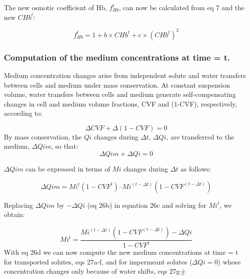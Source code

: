 \documentclass[a4paper]{article}
\newcommand{\cell}[1]{C#1}
\newcommand{\CHb}{\cell{Hb}}
\begin{document}
The new osmotic coefficient of Hb, $f_{Hb}^t$, can now be calculated from eq 7 and the new $\CHb^t$:

\setcounter{equation}{24}
\renewcommand{\theequation}{\arabic{equation}}

\begin{equation}
f_{Hb}^t = 1 + b\times\CHb^t + c\times (CHb^t)^2
\end{equation}

\subsubsection{Computation of the medium concentrations at time = t.}
Medium concentration changes arise from independent solute and water transfers between cells and medium under mass conservation.  At constant suspension volume, water transfers between cells and medium generate self-compensating changes in cell and medium volume fractions, CVF and (1-CVF), respectively, according to:

\setcounter{equation}{0}
\renewcommand{\theequation}{26\alph{equation}}

\begin{equation}
\Delta CVF + \Delta (1-CVF) = 0
\end{equation}
By mass conservation, the $Qi$ changes during $\Delta t$, $\Delta Qi$, are transferred to the medium, $\Delta Qim$, so that:
\begin{equation}
\Delta Qim + \Delta Qi = 0  
\end{equation}

$\Delta Qim$ can be expressed in terms of $Mi$ changes during $\Delta t$ as follows:

\begin{equation}
\Delta Qim = Mi^t(1-CVF^t) – Mi^{(t-\Delta t)}(1-CVF^{(t-\Delta t)}) 
\end{equation}

Replacing $\Delta Qim$ by $-\Delta Qi$ (eq 26b) in equation 26c and solving for $Mi^t$, we obtain:

\begin{equation}
Mi^t = \frac{Mi^{(t-\Delta t)}(1 - CVF^{(t-\Delta t)}) - \Delta Qi}{1 - CVF^t}
\end{equation}
With eq 26d we can now compute the new medium concentrations at time = t for transported solutes, eqs 27a-f, and for impermeant solutes ($\Delta Qi = 0$) whose concentration changes only because of water shifts, eqs 27g-j:

\setcounter{equation}{0}
\renewcommand{\theequation}{27\alph{equation}}
\end{document}
